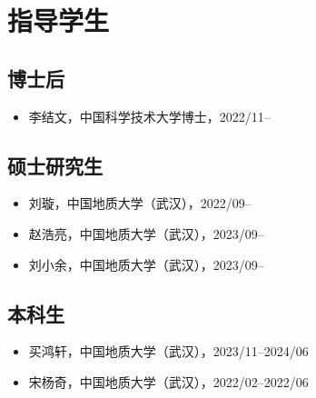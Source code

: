 \section{指导学生}

\subsection{博士后}
\begin{itemize}
\item 李结文，中国科学技术大学博士，2022/11--
\end{itemize}

\subsection{硕士研究生}
\begin{itemize}
\item 刘璇，中国地质大学（武汉），2022/09--
\item 赵浩亮，中国地质大学（武汉），2023/09--
\item 刘小余，中国地质大学（武汉），2023/09--
\end{itemize}

\subsection{本科生}
\begin{itemize}
\item 买鸿轩，中国地质大学（武汉），2023/11--2024/06
\item 宋杨奇，中国地质大学（武汉），2022/02--2022/06
\end{itemize}

